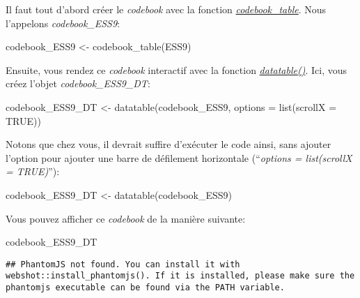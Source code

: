 \documentclass[
]{book}
\newenvironment{Shaded}{\begin{snugshade}}{\end{snugshade}}
\newcommand{\AttributeTok}[1]{\textcolor[rgb]{0.77,0.63,0.00}{#1}}
\newcommand{\ConstantTok}[1]{\textcolor[rgb]{0.00,0.00,0.00}{#1}}
\newcommand{\FunctionTok}[1]{\textcolor[rgb]{0.00,0.00,0.00}{#1}}
\newcommand{\NormalTok}[1]{#1}
\newcommand{\OtherTok}[1]{\textcolor[rgb]{0.56,0.35,0.01}{#1}}
\begin{document}
Il faut tout d'abord créer le \emph{codebook} avec la fonction \href{https://www.rdocumentation.org/packages/codebook/versions/0.9.2/topics/codebook_table}{\emph{codebook\_table}}. Nous l'appelons \emph{codebook\_ESS9}:

\begin{Shaded}
\begin{Highlighting}[]
\NormalTok{codebook\_ESS9 }\OtherTok{\textless{}{-}} \FunctionTok{codebook\_table}\NormalTok{(ESS9)}
\end{Highlighting}
\end{Shaded}

Ensuite, vous rendez ce \emph{codebook} interactif avec la fonction \href{https://www.rdocumentation.org/packages/DT/versions/0.26/topics/datatable}{\emph{datatable()}}. Ici, vous créez l'objet \emph{codebook\_ESS9\_DT}:

\begin{Shaded}
\begin{Highlighting}[]
\NormalTok{codebook\_ESS9\_DT }\OtherTok{\textless{}{-}} \FunctionTok{datatable}\NormalTok{(codebook\_ESS9, }\AttributeTok{options =} \FunctionTok{list}\NormalTok{(}\AttributeTok{scrollX =} \ConstantTok{TRUE}\NormalTok{))}
\end{Highlighting}
\end{Shaded}

Notons que chez vous, il devrait suffire d'exécuter le code ainsi, sans ajouter l'option pour ajouter une barre de défilement horizontale (``\emph{options = list(scrollX = TRUE)}''):

\begin{Shaded}
\begin{Highlighting}[]
\NormalTok{codebook\_ESS9\_DT }\OtherTok{\textless{}{-}} \FunctionTok{datatable}\NormalTok{(codebook\_ESS9)}
\end{Highlighting}
\end{Shaded}

Vous pouvez afficher ce \emph{codebook} de la manière suivante:

\begin{Shaded}
\begin{Highlighting}[]
\NormalTok{codebook\_ESS9\_DT}
\end{Highlighting}
\end{Shaded}

\begin{verbatim}
## PhantomJS not found. You can install it with webshot::install_phantomjs(). If it is installed, please make sure the phantomjs executable can be found via the PATH variable.
\end{verbatim}
\end{document}
